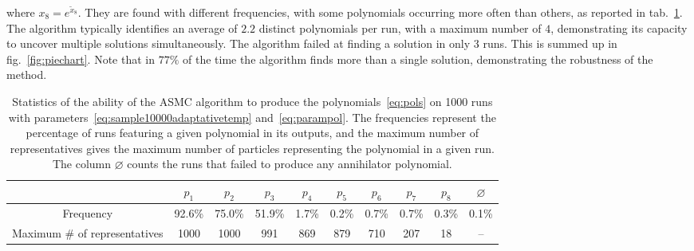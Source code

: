 \documentclass[11pt,a4paper]{article}
\begin{document}
	where $x_{8} = e^{\tilde{x}_{8}}$. They are found with different frequencies, with some polynomials occurring more often than others, as reported in tab.~\ref{table:results}. The algorithm typically identifies an average of $2.2$ distinct polynomials per run, with a maximum number of $4$, demonstrating its capacity to uncover multiple solutions simultaneously. The algorithm failed at finding a solution in only 3 runs. This is summed up in fig.~\ref{fig:piechart}. Note that in $77\%$ of the time the algorithm finds more than a single solution, demonstrating the robustness of the method.

	\begin{table}
		\centering
		\renewcommand{\arraystretch}{1.3}
		\begin{tabular}{c|ccccccccc}
			& $p_{1}$ & $p_{2}$ & $p_{3}$ & $p_{4}$ & $p_{5}$ & $p_{6}$ & $p_{7}$  & $p_{8}$&  $\varnothing$  \\\hline\hline
			Frequency & 92.6\% & 75.0\% & 51.9\% & 1.7\% & 0.2\% & 0.7\% & 0.7\% & 0.3\% & 0.1\% \\
			Maximum \# of representatives & 1000 & 1000 & 991 & 869 & 879 & 710 & 207 & 18 & --
		\end{tabular}
		\caption{Statistics of the ability of the ASMC algorithm to produce the polynomials~\eqref{eq:pols} on 1000 runs with parameters~\eqref{eq:sample10000adaptativetemp} and~\eqref{eq:parampol}. The frequencies represent the percentage of runs featuring a given polynomial in its outputs, and the maximum number of representatives gives the maximum number of particles representing the polynomial in a given run. The column $\varnothing$ counts the runs that failed to produce any annihilator polynomial.}
		\label{table:results}
	\end{table}
\end{document}
